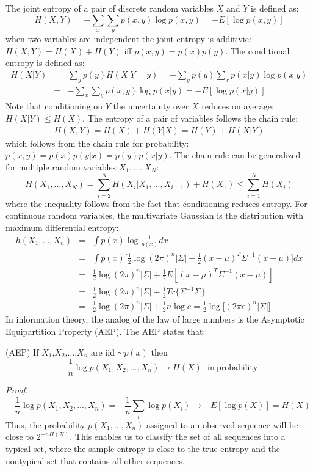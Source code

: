 The joint entropy of a pair of discrete random variables $X$ and $Y$ is defined as:
\begin{equation}
    H(X,Y) = -\sum_x \sum_y p(x,y) \log p(x,y) = -E[\log p(x,y)]
\end{equation}
when two variables are independent the joint entropy is additivie: $H(X,Y) = H(X) + H(Y)$ iff $p(x,y) = p(x)p(y)$. The conditional entropy is defined as:
\begin{eqnarray}
    H(X|Y) &=& \sum_y p(y)H(X|Y=y) = -\sum_y p(y)\sum_x p(x|y)\log p(x|y) \\
           &=& -\sum_x \sum_y p(x,y)\log p(x|y) = -E[\log p(x|y)]
\end{eqnarray}
Note that conditioning on $Y$ the uncertainty over $X$ reduces on average: $H(X|Y) \leq H(X)$. The entropy of a pair of variables follows the chain rule:
\begin{eqnarray}
    H(X,Y) = H(X) + H(Y|X) = H(Y) + H(X|Y)
\end{eqnarray}
which follows from the chain rule for probability: $p(x,y) = p(x)p(y|x) = p(y)p(x|y)$. The chain rule can be generalized for multiple random variables $X_1,...,X_N$:
\begin{equation}
    H(X_1,...,X_N) = \sum_{i=2}^{N}H(X_i|X_1,...,X_{i-1}) + H(X_1) \leq \sum_{i=1}^{N} H(X_i)
\end{equation}
where the inequality follows from the fact that conditioning reduces entropy. For continuous random variables, the multivariate Gaussian is the distribution with maximum differential entropy:
\begin{eqnarray}
    h(X_1,...,X_n) &=& \int p(x) \log \frac{1}{p(x)} dx \\
    &=& \int p(x) \bigg[\frac{1}{2}\log (2\pi)^{n}|\Sigma| + \frac{1}{2}(x-\mu)^{T}\Sigma^{-1}(x-\mu)\bigg] dx \\
    &=& \frac{1}{2}\log (2\pi)^{n}|\Sigma| + \frac{1}{2}E[(x-\mu)^{T}\Sigma^{-1}(x-\mu)] \\
    &=& \frac{1}{2}\log (2\pi)^{n}|\Sigma| + \frac{1}{2}Tr\{\Sigma^{-1}\Sigma\} \\
    &=& \frac{1}{2}\log (2\pi)^{n}|\Sigma| + \frac{1}{2}n \log e = \frac{1}{2}\log\big[(2\pi e)^n|\Sigma|\big] 
\end{eqnarray}
In information theory, the analog of the law of large numbers is the Asymptotic Equipartition Property (AEP). The AEP states that:
\begin{theorem}
(AEP) If $X_1$,$X_2$,...,$X_n$ are iid $\sim p(x)$ then
\begin{equation}
    -\frac{1}{n} \log p(X_1, X_2,...,X_n) \rightarrow H(X) ~~~\mathrm{in~probability}
\end{equation}
\end{theorem}
\textit{Proof}.
\begin{equation}
    -\frac{1}{n}\log p(X_1, X_2,...,X_n) = -\frac{1}{n}\sum_i \log p(X_i) \rightarrow -E[\log p(X)] = H(X)
\end{equation}
Thus, the probability $p(X_1,...,X_n)$ assigned to an observed sequence will be close to $2^{-nH(X)}$. This enables us to classify the set of all sequences into a typical set, where the sample entropy is close to the true entropy and the nontypical set that contains all other sequences. 

